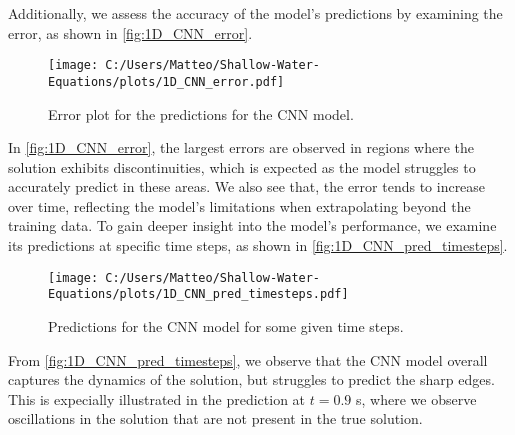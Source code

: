 Additionally, we assess the accuracy of the model's predictions by examining the error, as shown in \autoref{fig:1D_CNN_error}.
\begin{figure}[H]
    \centering
    \texttt{[image: C:/Users/Matteo/Shallow-Water-Equations/plots/1D\_CNN\_error.pdf]}
    \caption{Error plot for the predictions for the CNN model.}\label{fig:1D_CNN_error}
\end{figure}
In \autoref{fig:1D_CNN_error}, the largest errors are observed in regions where the solution exhibits discontinuities, which is expected as the model struggles to accurately predict in these areas.
We also see that, the error tends to increase over time, reflecting the model's limitations when extrapolating beyond the training data.
To gain deeper insight into the model's performance, we examine its predictions at specific time steps, as shown in \autoref{fig:1D_CNN_pred_timesteps}.
\begin{figure}[H]
    \centering
    \texttt{[image: C:/Users/Matteo/Shallow-Water-Equations/plots/1D\_CNN\_pred\_timesteps.pdf]}
    \caption{Predictions for the CNN model for some given time steps.}\label{fig:1D_CNN_pred_timesteps}
\end{figure}
From \autoref{fig:1D_CNN_pred_timesteps}, we observe that the CNN model overall captures the dynamics of the solution, but struggles to predict the sharp edges.
This is expecially illustrated in the prediction at $t = 0.9$ s, where we observe oscillations in the solution that are not present in the true solution.


